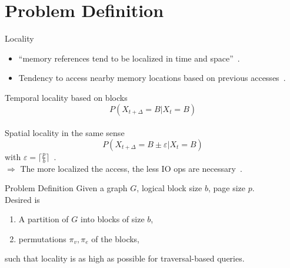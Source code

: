 \documentclass[rgb]{beamer}
\begin{document}
\section{Problem Definition}
    \begin{frame}[allowframebreaks]{Locality}
            \begin{itemize}
                \item  ``memory references tend to be localized in time and space''~\autocite{jacob2010memory}. \\ [4em]
                \item Tendency to access nearby memory locations based on previous accesses~\autocite{denning2006locality}. 
            \end{itemize}
            

         \framebreak
            Temporal locality based on blocks 
                \[ P (X_{t + \Delta} = B | X_t = B) \] \\ [1em]
            Spatial locality in the same sense 
                \[ P(X_{t + \Delta} = B \pm \varepsilon | X_t = B) \] 
                with $\varepsilon = \lceil \frac{p}{b} \rceil$~\autocite{gupta2013locality}. \\ [3em]
                
                
                $\Rightarrow$ The more localized the access, the less IO ops are necessary~\autocite{gupta2013locality}.
          
        \end{frame}

     \begin{frame}{Problem Definition}
            Given a graph $G$, logical block size $b$, page size $p$. \\ [2em]
            Desired is \\ [1em]
            \begin{enumerate}
            \item A partition of $G$ into blocks of size $b$, \\ [1em]
            \item permutations $\pi_v, \pi_e$ of the blocks,\\ [1.5em]
            \end{enumerate}
            such that locality is as high as possible for traversal-based queries.
    \end{frame}
    
\end{document}
